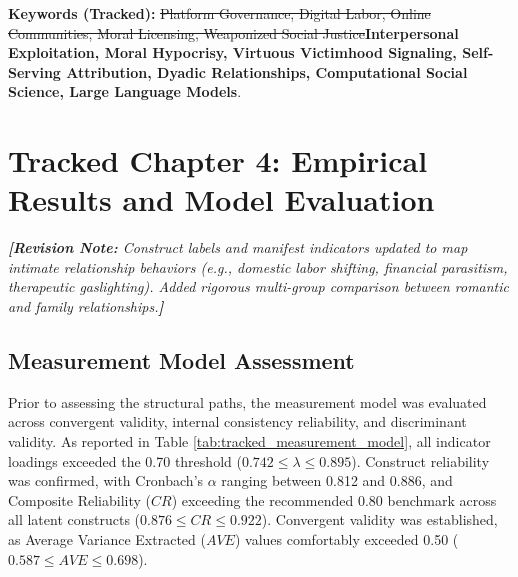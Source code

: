 \documentclass[11pt,a4paper]{article}
\newcommand{\textadded}[1]{{\color{blue!80!black}\textbf{#1}}}
\newcommand{\textdeleted}[1]{{\color{red!70!black}\sout{#1}}}
\newcommand{\textnote}[1]{\noindent\textit{\textcolor{teal!80!black}{\textbf{[Revision Note:} #1\textbf{]}}}\\[0.5ex]}
\begin{document}
\vspace{0.5em}
\noindent \textbf{Keywords (Tracked):} \textdeleted{Platform Governance, Digital Labor, Online Communities, Moral Licensing, Weaponized Social Justice}\textadded{Interpersonal Exploitation, Moral Hypocrisy, Virtuous Victimhood Signaling, Self-Serving Attribution, Dyadic Relationships, Computational Social Science, Large Language Models}.

\vspace{1.5em}

\section{Tracked Chapter 4: Empirical Results and Model Evaluation}
\label{sec:tracked_results}

\textnote{Construct labels and manifest indicators updated to map intimate relationship behaviors (e.g., domestic labor shifting, financial parasitism, therapeutic gaslighting). Added rigorous multi-group comparison between romantic and family relationships.}

\subsection{Measurement Model Assessment}
Prior to assessing the structural paths, the measurement model was evaluated across convergent validity, internal consistency reliability, and discriminant validity. As reported in Table \ref{tab:tracked_measurement_model}, all indicator loadings exceeded the 0.70 threshold ($0.742 \le \lambda \le 0.895$). Construct reliability was confirmed, with Cronbach's $\alpha$ ranging between 0.812 and 0.886, and Composite Reliability ($CR$) exceeding the recommended 0.80 benchmark across all latent constructs ($0.876 \le CR \le 0.922$). Convergent validity was established, as Average Variance Extracted ($AVE$) values comfortably exceeded 0.50 ($0.587 \le AVE \le 0.698$).
\end{document}
